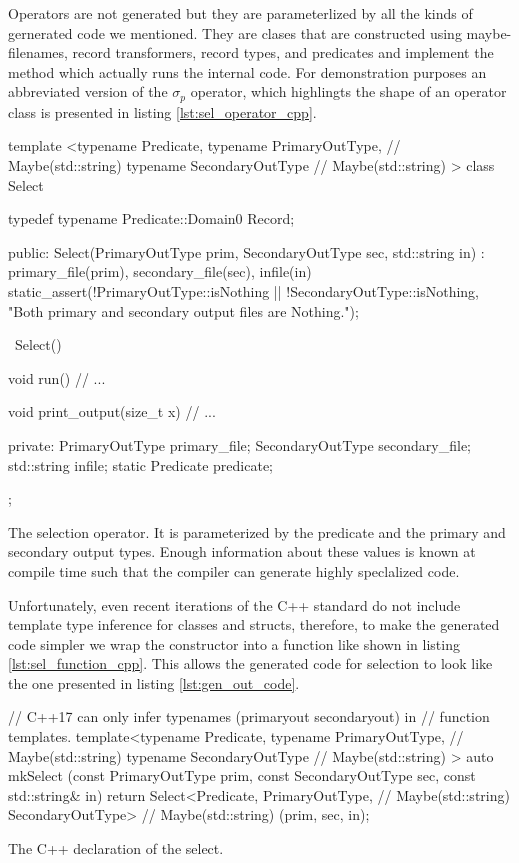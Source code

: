 Operators are not generated but they are parameterlized by all the
kinds of gernerated code we mentioned. They are clases that are
constructed using maybe-filenames, record transformers, record types,
and predicates and implement the  method which actually
runs the internal code. For demonstration purposes an abbreviated
version of the \(\sigma_p\) operator, which highlingts the shape of an
operator class is presented in listing \ref{lst:sel_operator_cpp}.

\begin{code}
\begin{cppcode}
template <typename Predicate,
          typename PrimaryOutType,   // Maybe(std::string)
          typename SecondaryOutType  // Maybe(std::string)
          >
class Select {
  typedef typename Predicate::Domain0 Record;

public:
  Select(PrimaryOutType prim, SecondaryOutType sec, std::string in)
    : primary_file(prim), secondary_file(sec), infile(in) {
    static_assert(!PrimaryOutType::isNothing || !SecondaryOutType::isNothing,
                  "Both primary and secondary output files are Nothing.");
  }

  ~Select() {}

  void run() {
    // ...
  }

  void print_output(size_t x) {
    // ...
  }

private:
  PrimaryOutType primary_file;
  SecondaryOutType secondary_file;
  std::string infile;
  static Predicate predicate;
};
\end{cppcode}
  \caption{\label{lst:sel_operator_cpp}The selection operator. It is
    parameterized by the predicate and the primary and secondary
    output types. Enough information about these values is known at
    compile time such that the compiler can generate highly
    speclalized code.}
\end{code}

Unfortunately, even recent iterations of the C++ standard do not
include template type inference for classes and structs, therefore, to
make the generated code simpler we wrap the constructor into a
function like shown in listing \ref{lst:sel_function_cpp}. This allows the
generated code for selection to look like the one presented in listing
\ref{lst:gen_out_code}.

\begin{code}
\begin{cppcode}
// C++17 can only infer typenames (primaryout secondaryout) in
// function templates.
template<typename Predicate,
         typename PrimaryOutType,   // Maybe(std::string)
         typename SecondaryOutType  // Maybe(std::string)
         >
auto mkSelect (const PrimaryOutType prim,
               const SecondaryOutType sec,
               const std::string& in) {
  return Select<Predicate,
                PrimaryOutType,   // Maybe(std::string)
                SecondaryOutType> // Maybe(std::string)
    (prim, sec, in);
}
\end{cppcode}
\caption{\label{lst:sel_function_cpp}The C++ declaration of the select.}
\end{code}


